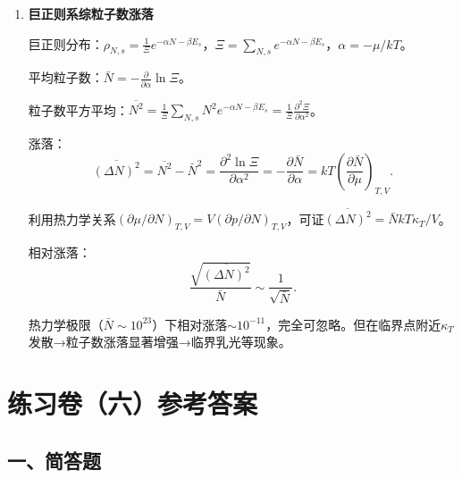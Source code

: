 \documentclass[12pt,a4paper,fontset=mac]{ctexart}
\newcommand{\đ}{\mathrm{đ}}
\begin{document}
\begin{enumerate}
\textbf{统一性}：$S=-k\sum_s\rho_s\ln\rho_s$是微正则系综（$\rho_s=1/\Omega$）、正则系综（$\rho_s=e^{-\beta E_s}/Z$）和巨正则系综的熵的统一表达式。这是吉布斯熵公式，是统计物理中熵的最一般定义。

\item \textbf{巨正则系综粒子数涨落}

巨正则分布：$\rho_{N,s}=\frac{1}{\Xi}e^{-\alpha N-\beta E_s}$，$\Xi=\sum_{N,s}e^{-\alpha N-\beta E_s}$，$\alpha=-\mu/kT$。

平均粒子数：$\bar{N}=-\frac{\partial}{\partial\alpha}\ln\Xi$。

粒子数平方平均：$\overline{N^2}=\frac{1}{\Xi}\sum_{N,s}N^2e^{-\alpha N-\beta E_s}=\frac{1}{\Xi}\frac{\partial^2\Xi}{\partial\alpha^2}$。

涨落：
\[\overline{(\Delta N)^2}=\overline{N^2}-\bar{N}^2=\frac{\partial^2\ln\Xi}{\partial\alpha^2}=-\frac{\partial\bar{N}}{\partial\alpha}=kT\left(\frac{\partial\bar{N}}{\partial\mu}\right)_{T,V}.\]

利用热力学关系$(\partial\mu/\partial N)_{T,V}=V(\partial p/\partial N)_{T,V}$，可证$\overline{(\Delta N)^2}=\bar{N}kT\kappa_T/V$。

相对涨落：
\[\frac{\sqrt{\overline{(\Delta N)^2}}}{\bar{N}}\sim\frac{1}{\sqrt{\bar{N}}}.\]

热力学极限（$\bar{N}\sim10^{23}$）下相对涨落$\sim10^{-11}$，完全可忽略。但在临界点附近$\kappa_T$发散→粒子数涨落显著增强→临界乳光等现象。

\end{enumerate}

\newpage

\section*{练习卷（六）参考答案}

\subsection*{一、简答题}
\end{document}
